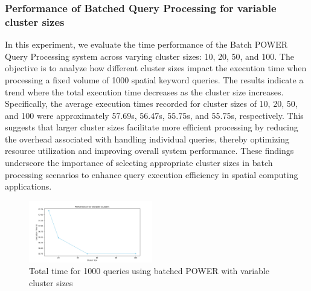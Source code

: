 \documentclass[conference]{IEEEtran}
\begin{document}
\subsubsection{Performance of Batched Query Processing for variable cluster sizes}
In this experiment, we evaluate the time performance of the Batch POWER Query Processing system across varying cluster sizes: 10, 20, 50, and 100. The objective is to analyze how different cluster sizes impact the execution time when processing a fixed volume of 1000 spatial keyword queries.
The results indicate a trend where the total execution time decreases as the cluster size increases. Specifically, the average execution times recorded for cluster sizes of 10, 20, 50, and 100 were approximately 57.69s, 56.47s, 55.75s, and 55.75s, respectively. This suggests that larger cluster sizes facilitate more efficient processing by reducing the overhead associated with handling individual queries, thereby optimizing resource utilization and improving overall system performance.
These findings underscore the importance of selecting appropriate cluster sizes in batch processing scenarios to enhance query execution efficiency in spatial computing applications.

\begin{figure}[htbp]
    \centering
    \includegraphics[width=0.48\textwidth]{Graph1.png}
    \caption{Total time for 1000 queries using batched POWER with variable cluster sizes}
    \label{fig:4}
\end{figure}
\end{document}
